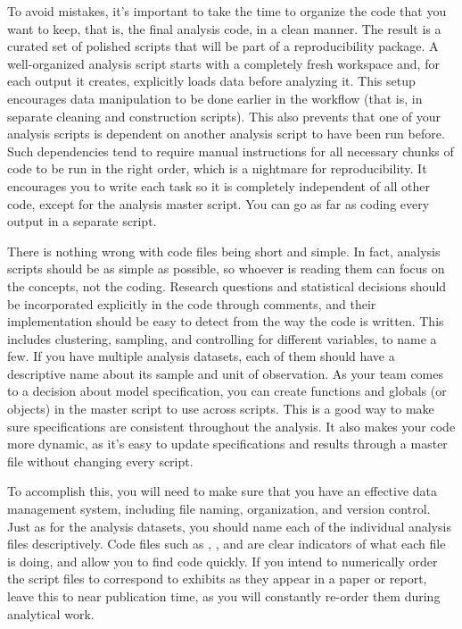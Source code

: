 To avoid mistakes, it's important to take the time
to organize the code that you want to keep, that is,
the final analysis code, in a clean manner.
The result is a curated set of polished scripts that
will be part of a reproducibility package.
A well-organized analysis script starts with a completely fresh workspace
and, for each output it creates, explicitly loads data before analyzing it.
This setup encourages data manipulation to be done earlier in the workflow
(that is, in separate cleaning and construction scripts).
This also prevents that one of your analysis scripts 
is dependent on another analysis script to have been run before.
Such dependencies tend to require manual instructions 
for all necessary chunks of code to be run in the right order,
which is a nightmare for reproducibility.
It encourages you to write each task so 
it is completely independent of all other code,
except for the analysis master script.
You can go as far as coding every output in a separate script.

There is nothing wrong with code files being short and simple.
In fact, analysis scripts should be as simple as possible,
so whoever is reading them can focus on the concepts, not the coding.
Research questions and statistical decisions should be incorporated explicitly in the code through comments,
and their implementation should be easy to detect from the way the code is written.
This includes clustering, sampling, and controlling for different variables, to name a few.
If you have multiple analysis datasets,
each of them should have a descriptive name about its sample and unit of observation.
As your team comes to a decision about model specification,
you can create functions and globals (or objects) in the master script to use across scripts.
This is a good way to make sure specifications are consistent throughout the analysis.
It also makes your code more dynamic,
as it's easy to update specifications and results
through a master file without changing every script.


To accomplish this, you will need to make sure that you have an effective data management system,
including file naming, organization, and version control.
Just as for the analysis datasets,
you should name each of the individual analysis files descriptively.
Code files such as ,
, and 
are clear indicators of what each file is doing, and allow you to find code quickly.
If you intend to numerically order the script files
to correspond to exhibits as they appear in a paper or report,
leave this to near publication time,
as you will constantly re-order them during analytical work.

